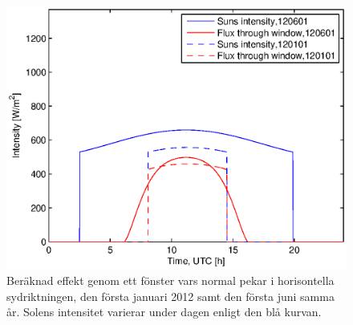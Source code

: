 \begin{figure}[hpbt]
\centering
\includegraphics[scale=1]{images/effekt0101and0601.eps}
\caption{\label{fig:effekt0101and0601} Beräknad effekt genom ett fönster vars normal pekar i horisontella sydriktningen, den första januari 2012 samt den första juni samma år. Solens intensitet varierar under dagen enligt den blå kurvan.}
\end{figure}
